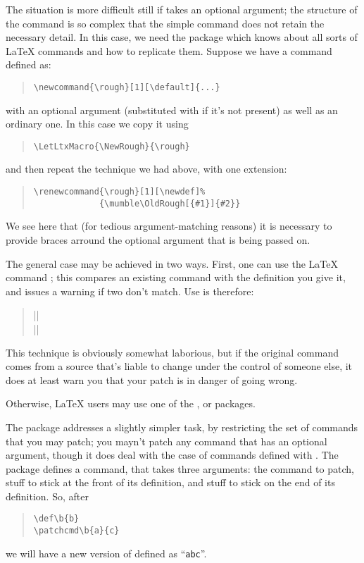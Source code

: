 The situation is more difficult still if  takes an
optional argument; the structure of the command is so complex that the
simple  command does not retain the necessary detail.  In
this case, we need the  package which knows about all
sorts of \LaTeX{} commands and how to replicate them.  Suppose we have
a command defined as:
\begin{quote}
\begin{verbatim}
\newcommand{\rough}[1][\default]{...}
\end{verbatim}
\end{quote}
with an optional argument (substituted with  if it's not
present) as well as an ordinary one.  In this case we copy it using
\begin{quote}
\begin{verbatim}
\LetLtxMacro{\NewRough}{\rough}
\end{verbatim}
\end{quote}
and then repeat the technique we had above, with one extension:
\begin{quote}
\begin{verbatim}
\renewcommand{\rough}[1][\newdef]%
             {\mumble\OldRough[{#1}]{#2}}
\end{verbatim}
\end{quote}
We see here that (for tedious argument-matching reasons) it is
necessary to provide braces arround the optional argument that is
being passed on.

The general case may be achieved in two ways.  First, one can use the
\LaTeX{} command ; this compares an existing command
with the definition you give it, and issues a warning if two don't
match.  Use is therefore:
\begin{quote}
  ||\\
  |\renewcommand{\complex}{|\meta{new definition}|}|
\end{quote}
This technique is obviously somewhat laborious, but if the original
command comes from a source that's liable to change under the control
of someone else, it does at least warn you that your patch is in
danger of going wrong.

Otherwise, \LaTeX{} users may use one of the ,
 or  packages.

The  package addresses a slightly simpler task, by
restricting the set of commands that you may patch; you mayn't patch
any command that has an optional argument, though it does deal with
the case of commands defined with .  The
package defines a  command, that takes three
arguments: the command to patch, stuff to stick at the front of its
definition, and stuff to stick on the end of its definition.  So,
after
\begin{quote}
\begin{verbatim}
\def\b{b}
\patchcmd\b{a}{c}
\end{verbatim}
\end{quote}
we will have a new version of  defined as ``\texttt{abc}''.

